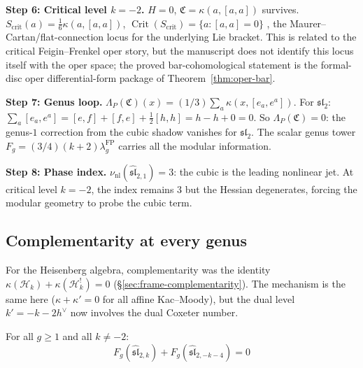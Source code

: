 \begin{computation}[The $\widehat{\mathfrak{sl}}_2$ shadow obstruction tower at
$k = 1$: from OPE to Weyl detection]
\medskip\noindent\textbf{Step 6: Critical level $k = -2$.}
$H = 0$, $\mathfrak{C} = \kappa(a,[a,a])$ survives.
$S_{\mathrm{crit}}(a) = \frac{1}{6}\kappa(a,[a,a])$,
$\operatorname{Crit}(S_{\mathrm{crit}}) = \{a : [a,a] = 0\}$
, the Maurer--Cartan/flat-connection locus for the underlying Lie
bracket. This is related to the critical Feigin--Frenkel oper story,
but the manuscript does not identify this locus itself with the oper
space; the proved bar-cohomological statement is the formal-disc oper
differential-form package of Theorem~\ref{thm:oper-bar}.

\medskip\noindent\textbf{Step 7: Genus loop.}
$\Lambda_P(\mathfrak{C})(x)
= (1/3)\sum_a \kappa(x,[e_a,e^a])$.
For $\mathfrak{sl}_2$:
$\sum_a [e_a,e^a] = [e,f] + [f,e] + \frac{1}{2}[h,h]
= h - h + 0 = 0$.
So $\Lambda_P(\mathfrak{C}) = 0$: the genus-$1$ correction from
the cubic shadow vanishes for $\mathfrak{sl}_2$. The scalar
genus tower $F_g = (3/4)(k+2)\lambda_g^{\mathrm{FP}}$ carries
all the modular information.

\medskip\noindent\textbf{Step 8: Phase index.}
$\nu_{\mathrm{nl}}(\widehat{\mathfrak{sl}}_{2,1}) = 3$: the cubic
is the leading nonlinear jet. At critical level $k = -2$, the
index remains $3$ but the Hessian degenerates, forcing the modular
geometry to probe the cubic term.
\end{computation}

\subsection{Complementarity at every genus}\label{subsec:sl2-complementarity}

For the Heisenberg algebra, complementarity was the identity $\kappa(\mathcal{H}_k) + \kappa(\mathcal{H}_k^!) = 0$ (\S\ref{sec:frame-complementarity}). The mechanism is the same here ($\kappa + \kappa' = 0$ for all affine Kac--Moody), but the dual level $k' = -k - 2h^\vee$ now involves the dual Coxeter number.

\begin{proposition}\label{prop:sl2-complementarity-all-genera}

For all $g \geq 1$ and all $k \neq -2$:
\begin{equation}\label{eq:sl2-complementarity-allgenera}
F_g(\widehat{\mathfrak{sl}}_{2,k}) + F_g(\widehat{\mathfrak{sl}}_{2,-k-4}) = 0
\end{equation}
\end{proposition}

